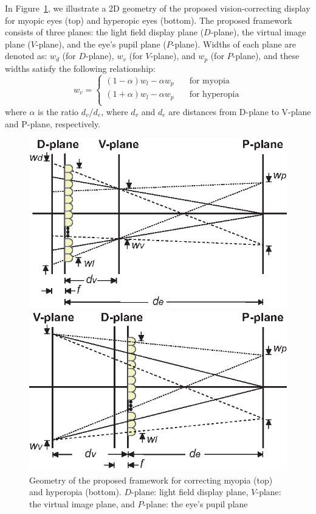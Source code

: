 In Figure~\ref{fig:overview}, we illustrate a 2D geometry of the proposed vision-correcting display for myopic eyes (top) and hyperopic eyes (bottom). The proposed framework consists of three planes: the light field display plane ($D$-plane), the virtual image plane ($V$-plane), and the eye's pupil plane ($P$-plane). Widths of each plane are denoted as: $w_d$ (for $D$-plane), $w_v$ (for $V$-plane), and $w_p$ (for $P$-plane), and these widths satisfy the following relationship:
\[ w_v =
  \begin{cases}
    (1-\alpha)w_l-\alpha w_p  & \quad \text{for myopia}\\
    (1+\alpha)w_l-\alpha w_p  & \quad \text{for hyperopia}\\
  \end{cases}
\]
where $\alpha$ is the ratio $d_v/d_e$, where $d_v$ and $d_e$ are distances from D-plane to V-plane and P-plane, respectively. 

\begin{figure}[t]
	    \begin{center}
   		\includegraphics[width=0.95\linewidth]{images/overview_myopic.eps}
	    \end{center}
	    \begin{center}
   		\includegraphics[width=0.95\linewidth]{images/overview_hyperopia.eps}
	\end{center}
	\caption{Geometry of the proposed framework for correcting myopia (top) and hyperopia (bottom). $D$-plane: light field display plane, $V$-plane: the virtual image plane, and $P$-plane: the eye's pupil plane}
\label{fig:overview}
\end{figure}

